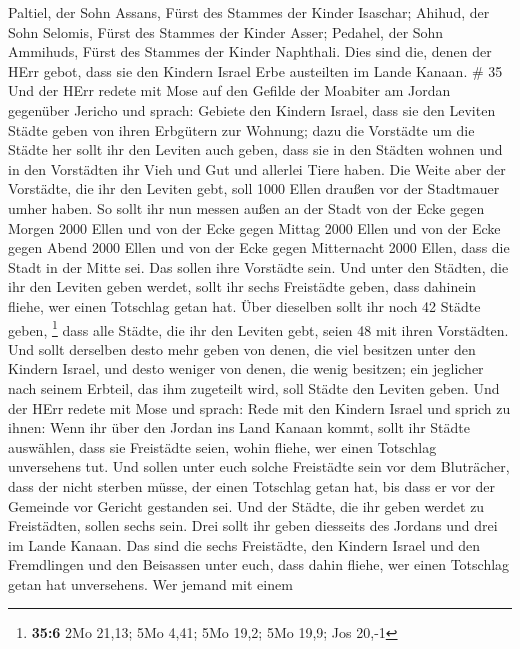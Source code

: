  Paltiel, der Sohn Assans, Fürst des Stammes der Kinder
Isaschar;  Ahihud, der Sohn Selomis, Fürst des Stammes der
Kinder Asser;  Pedahel, der Sohn Ammihuds, Fürst des
Stammes der Kinder Naphthali.  Dies sind die, denen der
HErr gebot, dass sie den Kindern Israel Erbe austeilten im Lande Kanaan.
\# 35  Und der HErr redete mit Mose auf den Gefilde der
Moabiter am Jordan gegenüber Jericho und sprach:  Gebiete
den Kindern Israel, dass sie den Leviten Städte geben von ihren
Erbgütern zur Wohnung;  dazu die Vorstädte um die Städte her
sollt ihr den Leviten auch geben, dass sie in den Städten wohnen und in
den Vorstädten ihr Vieh und Gut und allerlei Tiere haben. 
Die Weite aber der Vorstädte, die ihr den Leviten gebt, soll 1000 Ellen
draußen vor der Stadtmauer umher haben.  So sollt ihr nun
messen außen an der Stadt von der Ecke gegen Morgen 2000 Ellen und von
der Ecke gegen Mittag 2000 Ellen und von der Ecke gegen Abend 2000 Ellen
und von der Ecke gegen Mitternacht 2000 Ellen, dass die Stadt in der
Mitte sei. Das sollen ihre Vorstädte sein.  Und unter den
Städten, die ihr den Leviten geben werdet, sollt ihr sechs Freistädte
geben, dass dahinein fliehe, wer einen Totschlag getan hat. Über
dieselben sollt ihr noch 42 Städte geben, \footnote{\textbf{35:6} 2Mo
  21,13; 5Mo 4,41; 5Mo 19,2; 5Mo 19,9; Jos 20,-1}  dass alle
Städte, die ihr den Leviten gebt, seien 48 mit ihren Vorstädten.
 Und sollt derselben desto mehr geben von denen, die viel
besitzen unter den Kindern Israel, und desto weniger von denen, die
wenig besitzen; ein jeglicher nach seinem Erbteil, das ihm zugeteilt
wird, soll Städte den Leviten geben.  Und der HErr redete
mit Mose und sprach:  Rede mit den Kindern Israel und
sprich zu ihnen: Wenn ihr über den Jordan ins Land Kanaan kommt,
 sollt ihr Städte auswählen, dass sie Freistädte seien,
wohin fliehe, wer einen Totschlag unversehens tut.  Und
sollen unter euch solche Freistädte sein vor dem Bluträcher, dass der
nicht sterben müsse, der einen Totschlag getan hat, bis dass er vor der
Gemeinde vor Gericht gestanden sei.  Und der Städte, die
ihr geben werdet zu Freistädten, sollen sechs sein.  Drei
sollt ihr geben diesseits des Jordans und drei im Lande Kanaan.
 Das sind die sechs Freistädte, den Kindern Israel und den
Fremdlingen und den Beisassen unter euch, dass dahin fliehe, wer einen
Totschlag getan hat unversehens.  Wer jemand mit einem
